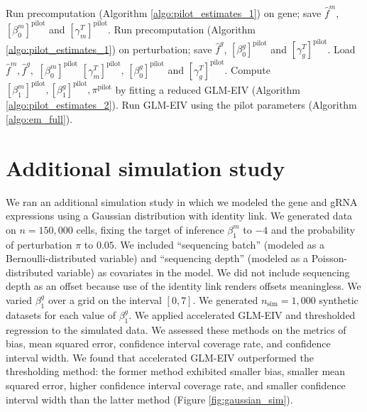 \documentclass[12pt]{article}
\begin{document}
\begin{appendices}
\begin{refsection}
\begin{algorithm}
\begin{algorithmic}
		\State Run precomputation (Algorithm \ref{algo:pilot_estimates_1}) on gene; save $\hat{f}^m$, $[\beta^m_0]^\textrm{pilot}$ and $[\gamma^T_m]^\textrm{pilot}$.
		\EndFor
		\State Run precomputation  (Algorithm \ref{algo:pilot_estimates_1}) on perturbation; save $\hat{f}^g$, $[\beta^g_0]^\textrm{pilot}$ and $[\gamma^T_g]^\textrm{pilot}$.
		\EndFor
		\State Load $\hat{f}^m, \hat{f}^g,$ $[\beta^m_0]^\textrm{pilot}$ $[\gamma^T_m]^\textrm{pilot}$, $[\beta^g_0]^\textrm{pilot}$ and $[\gamma^T_g]^\textrm{pilot}$.
		\State Compute $[\beta^m_1]^\textrm{pilot}, [\beta^g_1]^\textrm{pilot}, \pi^\textrm{pilot}$ by fitting a reduced GLM-EIV (Algorithm \ref{algo:pilot_estimates_2}).
		\State Run GLM-EIV using the pilot parameters (Algorithm \ref{algo:em_full}).
		\EndFor
	\end{algorithmic}
\end{algorithm}


\section{Additional simulation study}\label{sec:extra_sims}
		We ran an additional simulation study in which we modeled the gene and gRNA expressions using a Gaussian distribution with identity link. We generated data on $n = 150,000$ cells, fixing the target of inference $\beta^m_1$ to $-4$ and the probability of perturbation $\pi$ to $0.05$. We included ``sequencing batch'' (modeled as a Bernoulli-distributed variable) and ``sequencing depth'' (modeled as a Poisson-distributed variable) as covariates in the model. We did not include sequencing depth as an offset because use of the identity link renders offsets meaningless. We varied $\beta^g_1$ over a grid on the interval $[0,7].$ We generated $n_\textrm{sim} = 1,000$ synthetic datasets for each value of $\beta^g_1$. We applied accelerated GLM-EIV and thresholded regression to the simulated data. We assessed these methods on the metrics of bias, mean squared error, confidence interval coverage rate, and confidence interval width. We found that accelerated GLM-EIV outperformed the thresholding method: the former method exhibited smaller bias, smaller mean squared error, higher confidence interval coverage rate, and smaller confidence interval width than the latter method (Figure \ref{fig:gaussian_sim}). 
		

\end{refsection}
\end{appendices}
\end{document}
